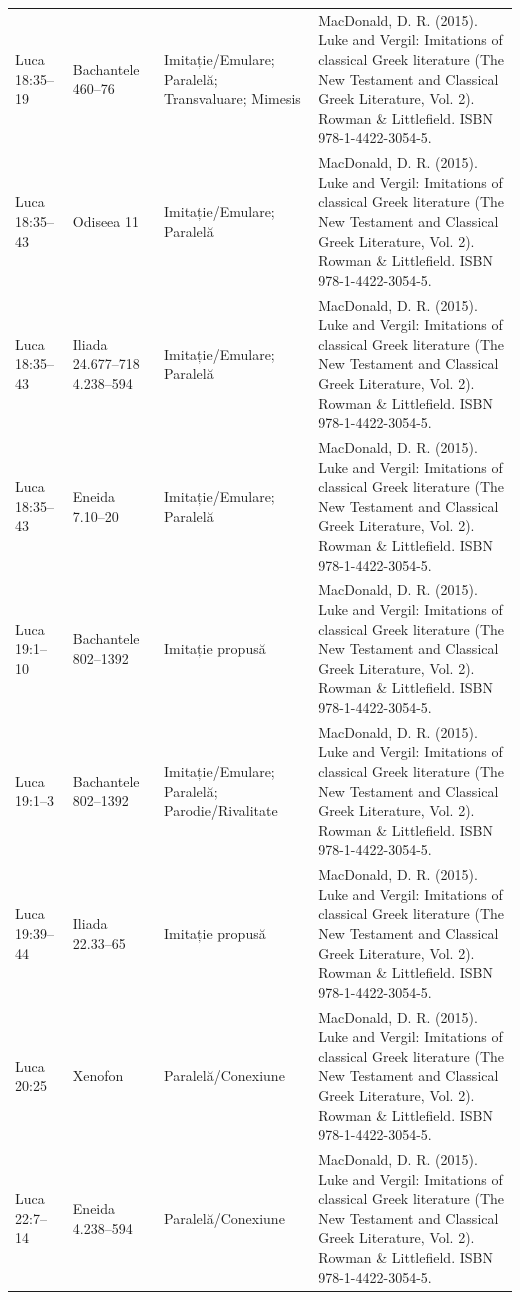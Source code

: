 \documentclass[12pt,a4paper,twoside,openany]{book}
\begin{document}
\begin{longtable}{L{1.4cm}L{1.7cm}L{3.1cm}L{8.4cm}}
Luca 18:35–19 & Bachantele 460–76 & Imitație/Emulare; Paralelă; Transvaluare; Mimesis & MacDonald, D. R. (2015). Luke and Vergil: Imitations of classical Greek literature (The New Testament and Classical Greek Literature, Vol. 2). Rowman \& Littlefield. ISBN 978-1-4422-3054-5. \\
Luca 18:35–43 & Odiseea 11 & Imitație/Emulare; Paralelă & MacDonald, D. R. (2015). Luke and Vergil: Imitations of classical Greek literature (The New Testament and Classical Greek Literature, Vol. 2). Rowman \& Littlefield. ISBN 978-1-4422-3054-5. \\
Luca 18:35–43 & Iliada 24.677–718 4.238–594 & Imitație/Emulare; Paralelă & MacDonald, D. R. (2015). Luke and Vergil: Imitations of classical Greek literature (The New Testament and Classical Greek Literature, Vol. 2). Rowman \& Littlefield. ISBN 978-1-4422-3054-5. \\
Luca 18:35–43 & Eneida 7.10–20 & Imitație/Emulare; Paralelă & MacDonald, D. R. (2015). Luke and Vergil: Imitations of classical Greek literature (The New Testament and Classical Greek Literature, Vol. 2). Rowman \& Littlefield. ISBN 978-1-4422-3054-5. \\
Luca 19:1–10 & Bachantele 802–1392 & Imitație propusă & MacDonald, D. R. (2015). Luke and Vergil: Imitations of classical Greek literature (The New Testament and Classical Greek Literature, Vol. 2). Rowman \& Littlefield. ISBN 978-1-4422-3054-5. \\
Luca 19:1–3 & Bachantele 802–1392 & Imitație/Emulare; Paralelă; Parodie/Rivalitate & MacDonald, D. R. (2015). Luke and Vergil: Imitations of classical Greek literature (The New Testament and Classical Greek Literature, Vol. 2). Rowman \& Littlefield. ISBN 978-1-4422-3054-5. \\
Luca 19:39–44 & Iliada 22.33–65 & Imitație propusă & MacDonald, D. R. (2015). Luke and Vergil: Imitations of classical Greek literature (The New Testament and Classical Greek Literature, Vol. 2). Rowman \& Littlefield. ISBN 978-1-4422-3054-5. \\
Luca 20:25 & Xenofon & Paralelă/Conexiune & MacDonald, D. R. (2015). Luke and Vergil: Imitations of classical Greek literature (The New Testament and Classical Greek Literature, Vol. 2). Rowman \& Littlefield. ISBN 978-1-4422-3054-5. \\
Luca 22:7–14 & Eneida 4.238–594 & Paralelă/Conexiune & MacDonald, D. R. (2015). Luke and Vergil: Imitations of classical Greek literature (The New Testament and Classical Greek Literature, Vol. 2). Rowman \& Littlefield. ISBN 978-1-4422-3054-5. \\

\end{longtable}
\end{document}
